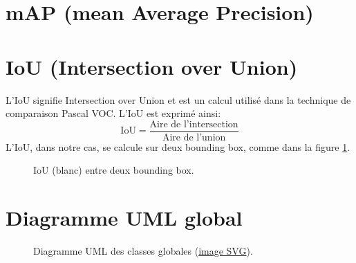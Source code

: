 \begin{appendices}
	
\section*{mAP (mean Average Precision)}\label{app:mAP}
	
	
	
	
\section*{IoU (Intersection over Union)}\label{app:IoU}
L'IoU signifie Intersection over Union et est un calcul utilisé dans la technique de comparaison Pascal VOC.
L'IoU est exprimé ainsi:
$$\text{IoU} = \frac{\text{Aire de l'intersection}}{\text{Aire de l'union}}$$
L'IoU, dans notre cas, se calcule sur deux bounding box, comme dans la figure \ref{fig:iou_example}.
\begin{figure}[!htbp]
\center
\caption{IoU (blanc) entre deux bounding box.}
\label{fig:iou_example}
\end{figure}
\FloatBarrier
	
	
	
\clearpage
\section*{Diagramme UML global}\label{app:UMLGlobal}
\begin{figure}[!htbp]
	\center
	\caption{Diagramme UML des classes globales (\href{https://github.com/gabriel-combe/PP2_Particle_Filter/blob/test/rapport/UML/classes.svg}{image SVG}).}
	\label{fig:uml_diagram_classes}
\end{figure}
\FloatBarrier
	
	
	
	

\end{appendices}
